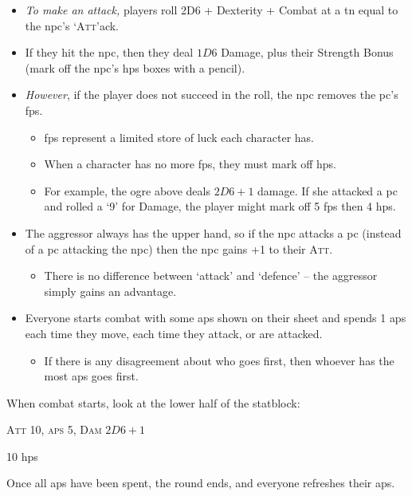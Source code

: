 \begin{multicols}{2}
{\begin{itemize}
    \item
    \textit{To make an attack,} players roll 2D6 + Dexterity + Combat at a \gls{tn} equal to the \gls{npc}'s `{\scshape Att}'ack.
    \item
    If they hit the \gls{npc}, then they deal $1D6$ Damage, plus their Strength Bonus (mark off the \gls{npc}'s \glspl{hp} boxes with a pencil).
    \item
    \emph{However}, if the player does not succeed in the roll, the \gls{npc} removes the \gls{pc}'s \glspl{fp}.
  \begin{itemize}
    \item
    \Glspl{fp} represent a limited store of luck each character has.
    \item
    When a character has no more \glspl{fp}, they must mark off \glspl{hp}.
    \item
    For example, the ogre above deals $2D6+1$ damage.
    If she attacked a \gls{pc} and rolled a `9' for Damage, the player might mark off 5 \glspl{fp} then 4 \glspl{hp}.
  \end{itemize}
    \item
    The aggressor always has the upper hand, so if the \gls{npc} attacks a \gls{pc} (instead of a \gls{pc} attacking the \gls{npc}) then the \gls{npc} gains +1 to their {\scshape Att}.
  \begin{itemize}
    \item
    There is no difference between `attack' and `defence' -- the aggressor simply gains an advantage.
  \end{itemize}
    \item
    Everyone starts combat with some \glspl{ap} shown on their sheet and spends 1 \glspl{ap} each time they move, each time they attack, or are attacked.
  \begin{itemize}
    \item
    If there is any disagreement about who goes first, then whoever has the most \glspl{ap} goes first.
  \end{itemize}

  \end{itemize}

  When combat starts, look at the lower half of the statblock:

  \hrulefill

  {\scshape Att 10, \glspl{ap} 5, Dam $2D6+1$}

  10 \glspl{hp} {\large{}}

  Once all \glspl{ap} have been spent, the round ends, and everyone refreshes their \glspl{ap}.

}
\end{multicols}

